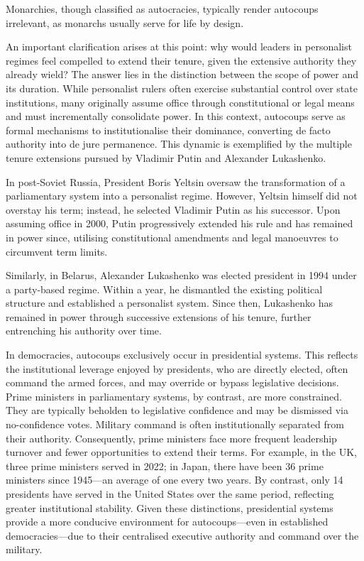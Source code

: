 \documentclass[
  12pt,
]{report}
\begin{document}
Monarchies, though classified as autocracies, typically render autocoups
irrelevant, as monarchs usually serve for life by design.

An important clarification arises at this point: why would leaders in
personalist regimes feel compelled to extend their tenure, given the
extensive authority they already wield? The answer lies in the
distinction between the scope of power and its duration. While
personalist rulers often exercise substantial control over state
institutions, many originally assume office through constitutional or
legal means and must incrementally consolidate power. In this context,
autocoups serve as formal mechanisms to institutionalise their
dominance, converting de facto authority into de jure permanence. This
dynamic is exemplified by the multiple tenure extensions pursued by
Vladimir Putin and Alexander Lukashenko.

In post-Soviet Russia, President Boris Yeltsin oversaw the
transformation of a parliamentary system into a personalist regime.
However, Yeltsin himself did not overstay his term; instead, he selected
Vladimir Putin as his successor. Upon assuming office in 2000, Putin
progressively extended his rule and has remained in power since,
utilising constitutional amendments and legal manoeuvres to circumvent
term limits.

Similarly, in Belarus, Alexander Lukashenko was elected president in
1994 under a party-based regime. Within a year, he dismantled the
existing political structure and established a personalist system. Since
then, Lukashenko has remained in power through successive extensions of
his tenure, further entrenching his authority over time.

In democracies, autocoups exclusively occur in presidential systems.
This reflects the institutional leverage enjoyed by presidents, who are
directly elected, often command the armed forces, and may override or
bypass legislative decisions. Prime ministers in parliamentary systems,
by contrast, are more constrained. They are typically beholden to
legislative confidence and may be dismissed via no-confidence votes.
Military command is often institutionally separated from their
authority. Consequently, prime ministers face more frequent leadership
turnover and fewer opportunities to extend their terms. For example, in
the UK, three prime ministers served in 2022; in Japan, there have been
36 prime ministers since 1945---an average of one every two years. By
contrast, only 14 presidents have served in the United States over the
same period, reflecting greater institutional stability. Given these
distinctions, presidential systems provide a more conducive environment
for autocoups---even in established democracies---due to their
centralised executive authority and command over the military.
\end{document}
